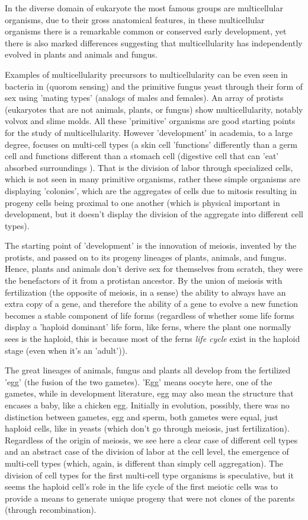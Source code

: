 In the diverse domain of eukaryote the most famous groups are multicellular organisms, due to their gross anatomical features, in these multicellular organisms there is a remarkable common or conserved early development, yet there is also marked differences suggesting that multicellularity has independently evolved in plants and animals and fungus.  

Examples of multicellularity precursors to multicellularity can be even seen in bacteria in (quorom sensing) and the primitive fungus yeast through their form of sex using 'mating types' (analogs of males and females)\cite{wolpert}. An array of protists (eukaryotes that are not animals, plants, or fungus) show multicellularity, notably volvox and slime molds.  All these 'primitive' organisms are good starting points for the study of multicellularity.  However 'development' in academia, to a large degree, focuses on multi-cell types (a skin cell 'functions' differently than a germ cell and functions different than a stomach cell (digestive cell that can 'eat' absorbed surroundings ).  That is the division of labor through specialized cells, which is not seen in many primitive organisms, rather these simple organisms are displaying 'colonies', which are the aggregates of cells due to mitosis resulting in progeny cells being proximal to one another (which is physical important in development, but it doesn't display the division of the aggregate into different cell types).

The starting point of 'development' is the innovation of meiosis, invented by the protists, and passed on to its progeny lineages of plants, animals, and fungus.  Hence, plants and animals don't derive sex for themselves from scratch, they were the benefactors of it from a protistan ancestor.  By the union of meiosis with fertilization (the opposite of meiosis, in a sense) the ability to always have an extra copy of a gene, and therefore the ability of a gene to evolve a new function becomes a stable component of life forms (regardless of whether some life forms display a 'haploid dominant' life form, like ferns, where the plant one normally sees is the haploid, this is because most of the ferns \textit{life cycle} exist in the haploid stage (even when it's an 'adult')).


The great lineages of animals, fungus and plants all develop from the fertilized 'egg' (the fusion of the two gametes).  'Egg' means oocyte here, one of the gametes, while in development literature, egg may also mean the structure that encases a baby, like a chicken egg.  Initially in evolution, possibly, there was no distinction between gametes, egg and sperm, both gametes were equal, just haploid cells, like in yeasts (which don't go through meiosis, just fertilization).  Regardless of the origin of meiosis, we see here a clear case of different cell types and an abstract case of the division of labor at the cell level, the emergence of multi-cell types (which, again, is different than simply cell aggregation).  The division of cell types for the first multi-cell type organisms is speculative, but it seems the haploid cell's role in the life cycle of the first meiotic cells was to provide a means to generate unique progeny that were not clones of the parents (through recombination).   

